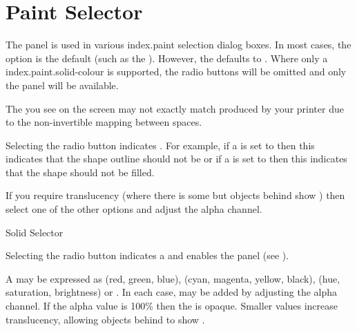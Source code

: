 \section{Paint Selector}\label{sec:paint}


The  panel is used in various \gls{index.paint}
selection dialog boxes.
In most cases, the  option is the default
(such as the ).  However, the
 defaults to .
Where only a \gls{index.paint.solid-colour} is supported, the radio
buttons will be omitted and only the  panel
will be available.

\begin{warning}
The  you see on the screen may not exactly match
 produced by your printer due to the non-invertible
mapping between  spaces.
\end{warning}


Selecting the  radio button indicates
. For example, if a  is set to
 then this indicates that the \gls{shape}
outline should not be  or if a
 is set to  then
this indicates that the \gls{shape} should not be filled.

If you require \gls{translucency} (where there is some 
but \glspl{object} behind show ) then select one of
the other  options and adjust the alpha channel.


{}
{Solid  Selector}

Selecting the  radio button indicates a
  and enables the
 panel (see ). 

A  may be expressed as
 (red, green, blue),
 (cyan, magenta, yellow, black),
 (hue, saturation, brightness) or
. In each case,
 may be added by adjusting
the alpha channel.  If the alpha value is 100\% then the
 is opaque.  Smaller values increase
\gls{translucency}, allowing \glspl{object} behind to show
.

